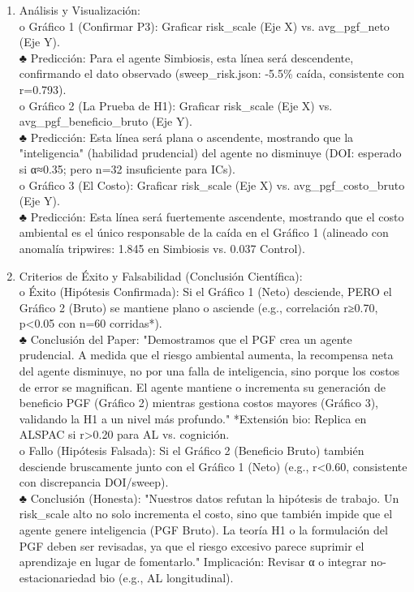 \begin{enumerate}
\def\labelenumi{\arabic{enumi}.}
\setcounter{enumi}{2}
\item
  Análisis y Visualización:\\
  o Gráfico 1 (Confirmar P3): Graficar risk\_scale (Eje X) vs.
  avg\_pgf\_neto (Eje Y).\\
  ♣ Predicción: Para el agente Simbiosis, esta línea será descendente,
  confirmando el dato observado (sweep\_risk.json: -5.5\% caída,
  consistente con r=0.793).\\
  o Gráfico 2 (La Prueba de H1): Graficar risk\_scale (Eje X) vs.
  avg\_pgf\_beneficio\_bruto (Eje Y).\\
  ♣ Predicción: Esta línea será plana o ascendente, mostrando que la
  "inteligencia" (habilidad prudencial) del agente no disminuye (DOI:
  esperado si α≈0.35; pero n=32 insuficiente para ICs).\\
  o Gráfico 3 (El Costo): Graficar risk\_scale (Eje X) vs.
  avg\_pgf\_costo\_bruto (Eje Y).\\
  ♣ Predicción: Esta línea será fuertemente ascendente, mostrando que el
  costo ambiental es el único responsable de la caída en el Gráfico 1
  (alineado con anomalía tripwires: 1.845 en Simbiosis vs. 0.037
  Control).
\item
  Criterios de Éxito y Falsabilidad (Conclusión Científica):\\
  o Éxito (Hipótesis Confirmada): Si el Gráfico 1 (Neto) desciende, PERO
  el Gráfico 2 (Bruto) se mantiene plano o asciende (e.g., correlación
  r≥0.70, p\textless0.05 con n=60 corridas*).\\
  ♣ Conclusión del Paper: "Demostramos que el PGF crea un agente
  prudencial. A medida que el riesgo ambiental aumenta, la recompensa
  neta del agente disminuye, no por una falla de inteligencia, sino
  porque los costos de error se magnifican. El agente mantiene o
  incrementa su generación de \textquotesingle beneficio
  PGF\textquotesingle{} (Gráfico 2) mientras gestiona costos mayores
  (Gráfico 3), validando la H1 a un nivel más profundo." *Extensión bio:
  Replica en ALSPAC si r\textgreater0.20 para AL vs. cognición.\\
  o Fallo (Hipótesis Falsada): Si el Gráfico 2 (Beneficio Bruto) también
  desciende bruscamente junto con el Gráfico 1 (Neto) (e.g.,
  r\textless0.60, consistente con discrepancia DOI/sweep).\\
  ♣ Conclusión (Honesta): "Nuestros datos refutan la hipótesis de
  trabajo. Un risk\_scale alto no solo incrementa el costo, sino que
  también impide que el agente genere inteligencia (PGF Bruto). La
  teoría H1 o la formulación del PGF deben ser revisadas, ya que el
  riesgo excesivo parece suprimir el aprendizaje en lugar de
  fomentarlo." Implicación: Revisar α o integrar no-estacionariedad bio
  (e.g., AL longitudinal).
\end{enumerate}

